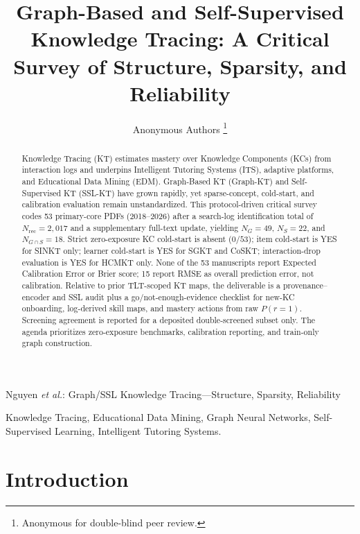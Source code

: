 \documentclass[lettersize,journal]{IEEEtran}
\begin{document}
\title{Graph-Based and Self-Supervised Knowledge Tracing: A Critical Survey of Structure, Sparsity, and Reliability}
\author{Anonymous Authors
\thanks{Anonymous for double-blind peer review.}%
}
%
{Nguyen \MakeLowercase{\textit{et al.}}: Graph/SSL Knowledge Tracing---Structure, Sparsity, Reliability}

\maketitle

\begin{abstract}
Knowledge Tracing (KT) estimates mastery over Knowledge Components (KCs) from interaction logs and underpins Intelligent Tutoring Systems (ITS), adaptive platforms, and Educational Data Mining (EDM). Graph-Based KT (Graph-KT) and Self-Supervised KT (SSL-KT) have grown rapidly, yet sparse-concept, cold-start, and calibration evaluation remain unstandardized. This protocol-driven critical survey codes 53 primary-core PDFs (2018--2026) after a search-log identification total of $N_{\mathrm{rec}}=2{,}017$ and a supplementary full-text update, yielding $N_G=49$, $N_S=22$, and $N_{G\cap S}=18$. Strict zero-exposure KC cold-start is absent ($0/53$); item cold-start is YES for SINKT only; learner cold-start is YES for SGKT and CoSKT; interaction-drop evaluation is YES for HCMKT only. None of the 53 manuscripts report Expected Calibration Error or Brier score; 15 report RMSE as overall prediction error, not calibration. Relative to prior TLT-scoped KT maps, the deliverable is a provenance--encoder and SSL audit plus a go/not-enough-evidence checklist for new-KC onboarding, log-derived skill maps, and mastery actions from raw $P(r=1)$. Screening agreement is reported for a deposited double-screened subset only. The agenda prioritizes zero-exposure benchmarks, calibration reporting, and train-only graph construction.
\end{abstract}

\begin{IEEEkeywords}
Knowledge Tracing, Educational Data Mining, Graph Neural Networks, Self-Supervised Learning, Intelligent Tutoring Systems.
\end{IEEEkeywords}

\section{Introduction}
\label{sec:intro}
\end{document}
